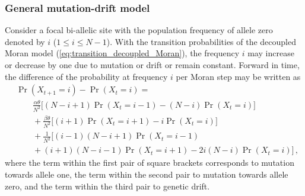 \documentclass[preprint]{elsarticle}
\newcommand\x[1]{\ensuremath{X_{#1}}}
\begin{document}
\subsubsection{General mutation-drift model}
Consider a focal bi-allelic site with the population frequency of allele zero denoted by $i$ ($1 \leq i \leq N-1$). With the transition probabilities of the decoupled Moran model (\ref{eq:transition_decoupled_Moran}), the frequency $i$ may increase or decrease by one due to mutation or drift or remain constant. Forward in time, the difference of the probability at frequency $i$ per Moran step may be written as
\begin{equation}\label{eq:forw_discr_mutation}
\begin{split}
&\Pr(\x{t+1}=i)-\Pr(\x{t}=i) = \\
&\qquad \frac{\alpha\theta}{N^2} \bigg[(N-i+1)\Pr(\x{t}=i-1) - (N-i)\Pr(\x{t}=i)\bigg]\\
&\qquad+\frac{\beta\theta}{N^2} \bigg[(i+1)\Pr(\x{t}=i+1) - i\Pr(\x{t}=i)\bigg]\\
&\qquad+\frac1{N^2}\bigg[(i-1)(N-i+1)\Pr(\x{t}=i-1) \\
&\qquad+ (i+1)(N-i-1)\Pr(\x{t}=i+1)-2i(N-i)\Pr(\x{t}=i)\bigg]\,,
\end{split}
\end{equation}
where the term within the first pair of square brackets corresponds to mutation towards allele one, the term within the second pair to mutation towards allele zero, and the term within the third pair to genetic drift.
\end{document}
